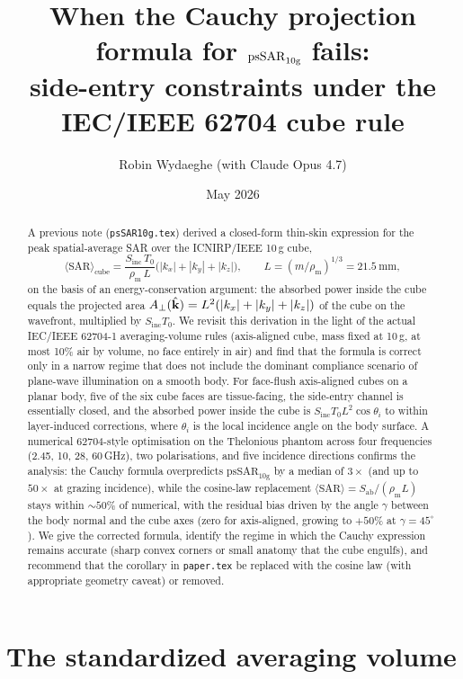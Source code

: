 \documentclass[11pt,a4paper]{article}
\title{%
  When the Cauchy projection formula for $\psSAR$ fails:\\
  side-entry constraints under the IEC/IEEE 62704 cube rule%
}
\author{Robin Wydaeghe (with Claude Opus 4.7)}
\date{May 2026}
\theoremstyle{definition}
\theoremstyle{remark}
\newcommand{\Sab}{S_{\mathrm{ab}}}
\newcommand{\Sinc}{S_{\mathrm{inc}}}
\newcommand{\Tzero}{T_0}
\newcommand{\khat}{\hat{\vb{k}}}
\newcommand{\SAR}{\ensuremath{\mathrm{SAR}}}
\newcommand{\psSAR}{\ensuremath{\mathrm{psSAR}_{10\mathrm{g}}}}
\newcommand{\rhom}{\rho_{\mathrm{m}}}
\begin{document}
\maketitle

\begin{abstract}
A previous note (\texttt{psSAR10g.tex}) derived a closed-form thin-skin
expression for the peak spatial-average SAR over the ICNIRP/IEEE 10\,g
cube,
\[
  \langle\SAR\rangle_{\mathrm{cube}}
  = \frac{\Sinc\,\Tzero}{\rhom\,L}\bigl(|k_x|+|k_y|+|k_z|\bigr),
  \qquad L = (m/\rhom)^{1/3}=21.5\ \mathrm{mm},
\]
on the basis of an energy-conservation argument: the absorbed power
inside the cube equals the projected area $A_\perp(\khat) =
L^2(|k_x|+|k_y|+|k_z|)$ of the cube on the wavefront, multiplied by
$\Sinc\Tzero$. We revisit this derivation in the light of the actual
IEC/IEEE 62704-1 averaging-volume rules (axis-aligned cube, mass
fixed at 10\,g, at most 10\% air by volume, no face entirely in air)
and find that the formula is correct only in a narrow regime that does
not include the dominant compliance scenario of plane-wave illumination
on a smooth body. For face-flush axis-aligned cubes on a planar body,
five of the six cube faces are tissue-facing, the side-entry channel
is essentially closed, and the absorbed power inside the cube is
$\Sinc\Tzero L^2\cos\theta_i$ to within layer-induced corrections,
where $\theta_i$ is the local incidence angle on the body surface.
A numerical 62704-style optimisation on the Thelonious phantom across
four frequencies (2.45, 10, 28, 60\,GHz), two polarisations, and five
incidence directions confirms the analysis: the Cauchy formula
overpredicts $\psSAR$ by a median of $3\times$ (and up to $50\times$
at grazing incidence), while the cosine-law replacement
$\langle\SAR\rangle = \Sab/(\rhom L)$ stays within $\sim 50\%$ of
numerical, with the residual bias driven by the angle $\gamma$ between
the body normal and the cube axes (zero for axis-aligned, growing to
$+50\%$ at $\gamma=45^\circ$). We give the corrected formula, identify
the regime in which the Cauchy expression remains accurate (sharp
convex corners or small anatomy that the cube engulfs), and recommend
that the corollary in \texttt{paper.tex} be replaced with the cosine
law (with appropriate geometry caveat) or removed.
\end{abstract}

\tableofcontents


\section{The standardized averaging volume}
\label{sec:standard}
\end{document}
